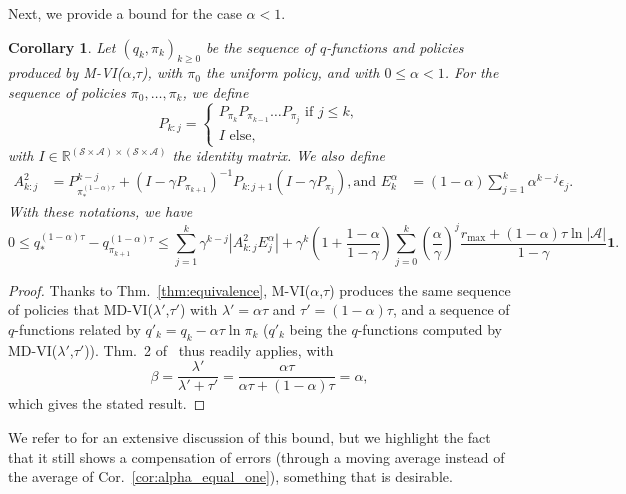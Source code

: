 \documentclass{article}
\newtheorem{cor}{Corollary}
\newcommand{\states}{\mathcal{S}}
\newcommand{\actions}{\mathcal{A}}
\newcommand{\un}{\mathbf{1}}
\begin{document}
Next, we provide a bound for the case $\alpha<1$.
\begin{cor}
    Let $(q_k,\pi_k)_{k\geq 0}$ be the sequence of $q$-functions and policies produced by M-VI($\alpha$,$\tau$), with $\pi_0$ the uniform policy, and with $0\leq\alpha < 1$.
    For the sequence of policies $\pi_0,\dots,\pi_k$, we define
    \begin{equation}
        P_{k:j} = \begin{cases}
            P_{\pi_k} P_{\pi_{k-1}} \dots P_{\pi_j} \text{ if } j\leq k,
            \\
            I \text{ else},
        \end{cases}
    \end{equation}
    with $I\in\mathbb{R}^{(\states\times\actions)\times(\states\times\actions)}$ the identity matrix. We also define
    \begin{align}
        A^2_{k:j} &= P_{\pi_*^{(1-\alpha)\tau}}^{k-j} + (I-\gamma P_{\pi_{k+1}})^{-1} P_{k:j+1}(I-\gamma P_{\pi_j}),
        \text{and }
        E^\alpha_k &= (1-\alpha)\sum_{j=1}^k \alpha^{k-j} \epsilon_j.
    \end{align}
    With these notations, we have
    \begin{equation}
        0 \leq q_*^{(1-\alpha)\tau} - q_{\pi_{k+1}}^{(1-\alpha)\tau} \leq \sum_{j=1}^k \gamma^{k-j}\left|A^2_{k:j} E^\alpha_j\right| + \gamma^k (1 + \frac{1-\alpha}{1-\gamma}) \sum_{j=0}^k \left(\frac{\alpha}{\gamma}\right)^j \frac{r_\text{max}+(1-\alpha)\tau\ln|\actions|}{1-\gamma}\un.
    \end{equation}
\end{cor}
\begin{proof}
    Thanks to Thm.~\ref{thm:equivalence}, M-VI($\alpha$,$\tau$) produces the same sequence of policies that MD-VI($\lambda'$,$\tau'$) with $\lambda'=\alpha\tau$ and $\tau'=(1-\alpha)\tau$, and a sequence of $q$-functions related by $q'_k = q_k - \alpha\tau \ln \pi_k$ ($q'_k$ being the $q$-functions computed by MD-VI($\lambda'$,$\tau'$)). Thm.~2 of~\citet{vieillard2020leverage} thus readily applies, with
    \begin{equation}
        \beta = \frac{\lambda'}{\lambda'+\tau'} = \frac{\alpha\tau}{\alpha \tau + (1-\alpha)\tau} = \alpha,
    \end{equation}
    which gives the stated result.
\end{proof}
We refer to \cite[Sec.~4.2]{vieillard2020leverage} for an extensive discussion of this bound, but we highlight the fact that it still shows a compensation of errors (through a moving average instead of the average of Cor.~\ref{cor:alpha_equal_one}), something that is desirable.
\end{document}
